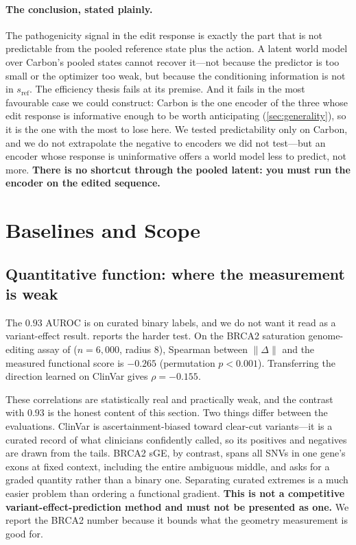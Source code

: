 \documentclass{article}
\newcommand{\sref}{s_{\mathrm{ref}}}
\newcommand{\D}{\Delta}
\begin{document}
\paragraph{The conclusion, stated plainly.} The pathogenicity signal in the edit response is exactly
the part that is not predictable from the pooled reference state plus the action. A latent world
model over Carbon's pooled states cannot recover it---not because the predictor is too small or the
optimizer too weak, but because the conditioning information is not in $\sref$. The efficiency
thesis fails at its premise. And it fails in the most favourable case we could construct: Carbon is
the one encoder of the three whose edit response is informative enough to be worth anticipating
(\cref{sec:generality}), so it is the one with the most to lose here. We tested predictability only
on Carbon, and we do not extrapolate the negative to encoders we did not test---but an encoder whose
response is uninformative offers a world model less to predict, not more. \textbf{There is no
shortcut through the pooled latent: you must run the encoder on the edited sequence.}

\figPredict
\tabControls
\tabPredict

\section{Baselines and Scope}
\label{sec:scope}

\subsection{Quantitative function: where the measurement is weak}
\label{sec:brca2}

The $0.93$ AUROC is on curated binary labels, and we do not want it read as a variant-effect result.
 reports the harder test. On the BRCA2 saturation genome-editing assay of
\citet{sahu2025} ($n{=}6{,}000$, radius $8$), Spearman between $\lVert\D\rVert$ and the measured
functional score is $-0.265$ (permutation $p<0.001$). Transferring the direction learned on ClinVar
gives $\rho=-0.155$.

These correlations are statistically real and practically weak, and the contrast with $0.93$ is the
honest content of this section. Two things differ between the evaluations. ClinVar is
ascertainment-biased toward clear-cut variants---it is a curated record of what clinicians
confidently called, so its positives and negatives are drawn from the tails. BRCA2 sGE, by contrast,
spans all SNVs in one gene's exons at fixed context, including the entire ambiguous middle, and asks
for a graded quantity rather than a binary one. Separating curated extremes is a much easier problem
than ordering a functional gradient. \textbf{This is not a competitive variant-effect-prediction
method and must not be presented as one.} We report the BRCA2 number because it bounds what the
geometry measurement is good for.
\end{document}
